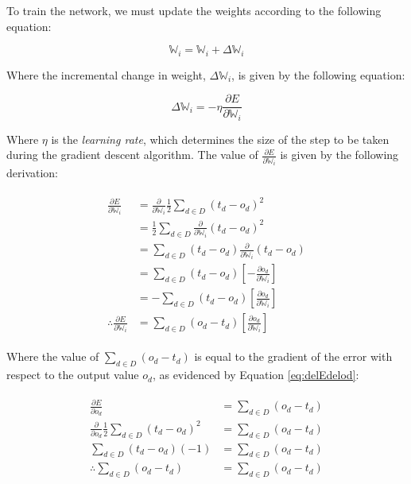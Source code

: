 \documentclass[a4paper]{article}
\begin{document}
To train the network, we must update the weights according to the following equation:

\begin{equation}
    \label{eq:trainW}
    \mathbb W_i = \mathbb W_i + \Delta{\mathbb W_i}
\end{equation}

Where the incremental change in weight, $\Delta{\mathbb W_i}$, is given by the following equation:

\begin{equation}
    \label{eq:deltaW}
    \Delta{\mathbb W_i} = -\eta \frac{\partial{E}}{\partial{\mathbb W_i}}
\end{equation}

Where $\eta$ is the \textit{learning rate}, which determines the size of the step to be taken during the gradient descent algorithm. The value of $\frac{\partial{E}}{\partial{\mathbb W_i}}$ is given by the following derivation:

\begin{gather}
    \begin{aligned}
        \frac{\partial{E}}{\partial{\mathbb W_i}} &= \frac{\partial}{\partial{\mathbb W_i}} \frac{1}{2} \sum_{d \in D}(t_d - o_d)^2 \\
        &= \frac{1}{2}\sum_{d \in D}\frac{\partial}{\partial{\mathbb W_i}}(t_d - o_d)^2 \\
        &= \sum_{d \in D}(t_d - o_d)\frac{\partial}{\partial{\mathbb W_i}}(t_d - o_d) \\
        &= \sum_{d \in D}(t_d - o_d)\left[-\frac{\partial{o_d}}{\partial{\mathbb W_i}}\right] \\
        &= -\sum_{d \in D}(t_d - o_d)\left[\frac{\partial{o_d}}{\partial{\mathbb W_i}}\right] \\
        \therefore \frac{\partial{E}}{\partial{\mathbb W_i}} &= \sum_{d \in D}(o_d - t_d)\left[\frac{\partial{o_d}}{\partial{\mathbb W_i}}\right]
    \end{aligned}
\end{gather}

Where the value of $\sum_{d \in D}(o_d - t_d)$ is equal to the gradient of the error with respect to the output value $o_d$, as evidenced by Equation \ref{eq:delEdelod}:

\begin{gather}
    \begin{aligned}
        \label{eq:delEdelod}
        \frac{\partial{E}}{\partial{o_d}} &= \sum_{d \in D}(o_d - t_d) \\
        \frac{\partial}{\partial{o_d}}\frac{1}{2}\sum_{d \in D}(t_d - o_d)^2 &= \sum_{d \in D}(o_d - t_d) \\
        \sum_{d \in D}(t_d - o_d)(-1) &= \sum_{d \in D}(o_d - t_d)\\
        \therefore \sum_{d \in D}(o_d - t_d) &= \sum_{d \in D}(o_d - t_d)
    \end{aligned}
\end{gather}
\end{document}
